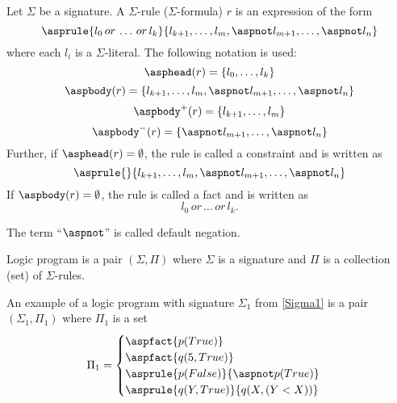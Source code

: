 \begin{definition}\label{def:rule}
    Let $\Sigma$ be a signature. A $\Sigma$-rule ($\Sigma$-formula) $r$ is an expression of the form
    \begin{equation*}
        \asprule{l_0\, or\, \ldots\, or\, l_k}{l_{k+1}, \ldots, l_{m}, \aspnot l_{m+1}, \ldots, \aspnot l_{n}}
    \end{equation*}
    where each $l_i$ is a $\Sigma$-literal. The following notation is used:
    \begin{equation*}
        \asphead(r) = \{l_0, \ldots, l_k\}
    \end{equation*}
    \begin{equation*}
        \aspbody(r) = \{l_{k+1}, \ldots, l_{m}, \aspnot l_{m+1}, \ldots, \aspnot l_n\}
    \end{equation*}
    \begin{equation*}
        \aspbody^+(r) = \{l_{k+1}, \ldots, l_{m}\}
    \end{equation*}
    \begin{equation*}
        \aspbody^-(r) = \{\aspnot l_{m+1}, \ldots, \aspnot l_n\}
    \end{equation*}
    Further, if $\asphead(r) = \emptyset$, the rule is called a constraint and is written as
    \begin{equation*}
        \asprule{}{l_{k+1}, \ldots, l_{m}, \aspnot l_{m+1}, \ldots, \aspnot l_{n}}
    \end{equation*}
    If $\aspbody(r) = \emptyset$, the rule is called a fact and is written as
    \begin{equation*}
        l_0\, or\, \ldots\, or\, l_k.
    \end{equation*}

    The term ``$\aspnot$'' is called default negation.
\end{definition}

\begin{definition}
    Logic program is a pair $(\Sigma, \Pi)$ where $\Sigma$ is a signature
    and $\Pi$ is a collection (set) of $\Sigma$-rules.
\end{definition}

\begin{example}\label{exp:logic_program1}
    An example of a logic program with signature $\Sigma_1$ from \cref{Sigma1}
    is a pair $(\Sigma_1, \Pi_1)$ where $\Pi_1$ is a set
    \begin{equation*}
        \Pi_1 =
            \begin{cases}
                \aspfact{p(True)}\\
                \aspfact{q(5, True)}\\
                \asprule{p(False)}{\aspnot p(True)}\\
                \asprule{q(Y, True)}{q(X, (Y < X))}
            \end{cases}
    \end{equation*}
\end{example}

